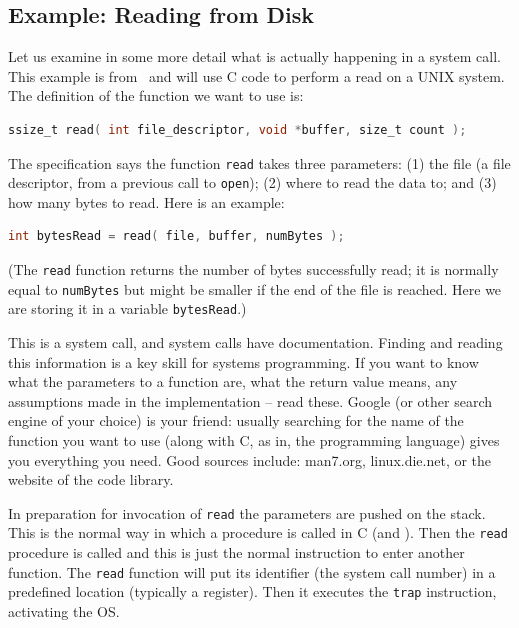 \subsection*{Example: Reading from Disk}
Let us examine in some more detail what is actually happening in a
system call. This example is from~\cite{mos} and will use C code to
perform a read on a UNIX system. The definition of the function we want to use is:

\begin{lstlisting}[language=C]
ssize_t read( int file_descriptor, void *buffer, size_t count );
\end{lstlisting}

The specification says the function
\texttt{read} takes three parameters: (1) the file (a file
descriptor, from a previous call to \texttt{open}); (2) where to read
the data to; and (3) how many bytes to read. Here is an example:

\begin{lstlisting}[language=C]
int bytesRead = read( file, buffer, numBytes );
\end{lstlisting}

(The \texttt{read} function returns the number of bytes successfully read; it is normally equal to \texttt{numBytes} but might be smaller if the end of the file is reached. Here we are storing it in a variable \texttt{bytesRead}.)

This is a system call, and system calls have documentation. Finding and reading this information is a key skill for systems programming. If you want to know what the parameters to a function are, what the return value means, any assumptions made in the implementation -- read these. Google (or other search engine of your choice) is your friend: usually searching for the name of the function you want to use (along with C, as in, the programming language) gives you everything you need.  Good sources include: man7.org, linux.die.net, or the website of the code library.



In preparation for invocation of \texttt{read} the parameters are pushed on the stack. This is the normal way in which a procedure is called in C (and \Cpp). Then the \texttt{read} procedure is called and this is just the normal instruction to enter another function. The \texttt{read} function will put its identifier (the system call number) in a predefined location (typically a register). Then it executes the \texttt{trap} instruction, activating the OS.

